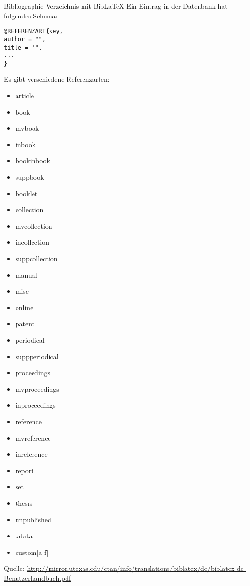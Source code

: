 \begin{frame}[fragile]{Bibliographie-Verzeichnis mit Bib\LaTeX}
Ein Eintrag in der Datenbank hat folgendes Schema:
\begin{lstlisting}[style=tex]
@REFERENZART{key,
author = "",
title = "",
...
}
\end{lstlisting}

Es gibt verschiedene Referenzarten:
\begin{small}
	\vspace{-1ex}
	\begin{multicols}{3}
		\begin{itemize}\setlength{\itemsep}{-0.5ex}
			\item article
			\item book
			\item mvbook
			\item inbook
			\item bookinbook
			\item suppbook
			\item booklet
			\item collection
			\item mvcollection
			\item incollection
			\item suppcollection
			\item manual
			\item misc
			\item online
			\item patent
			\item periodical
			\item suppperiodical
			\item proceedings
			\item mvproceedings
			\item inproceedings
			\item reference
			\item mvreference
			\item inreference
			\item report
			\item set
			\item thesis
			\item unpublished
			\item xdata
			\item custom[a-f]
		\end{itemize}
	\end{multicols}
\end{small}

Quelle: \url{http://mirror.utexas.edu/ctan/info/translations/biblatex/de/biblatex-de-Benutzerhandbuch.pdf}
\end{frame}

